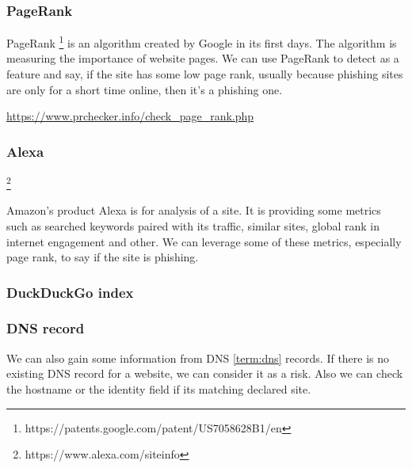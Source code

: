 \documentclass[
  digital, %
  oneside, %
  table,   %
  nolof,     %
  nolot,     %
]{fithesis3}
\newcounter{feature}
\newenvironment{feature}[1]{\stepcounter{feature}%
    \tcolorbox[beamer,%
    noparskip,breakable,
    colback=LightBlue,colframe=DarkBlue,%
    colbacklower=DarkBlue!75!LightBlue,%
    title=Feature~\thefeature: #1]}%
    {\endtcolorbox}
\begin{document}
\begin{feature}{Google index}

\end{feature}

\subsubsection{PageRank}

PageRank \footnote{https://patents.google.com/patent/US7058628B1/en} is an algorithm created by Google in its first days. The algorithm is measuring the importance of website pages. We can use PageRank to detect as a feature and say, if the site has some low page rank, usually because phishing sites are only for a short time online, then it's a phishing one.

\begin{feature}{PageRank}

\end{feature}
\url{https://www.prchecker.info/check_page_rank.php}

\subsubsection{Alexa}

\footnote{https://www.alexa.com/siteinfo}

Amazon's product Alexa is for analysis of a site. It is providing some metrics such as searched keywords paired with its traffic, similar sites, global rank in internet engagement and other. We can leverage some of these metrics, especially page rank, to say if the site is phishing.

\begin{feature}{Alexa siteinfo}

\end{feature}

\subsubsection{DuckDuckGo index}

\subsubsection{DNS record}

We can also gain some information from DNS \ref{term:dns} records. If there is no existing DNS record for a website, we can consider it as a risk. Also we can check the hostname or the identity field if its matching declared site.
\end{document}
